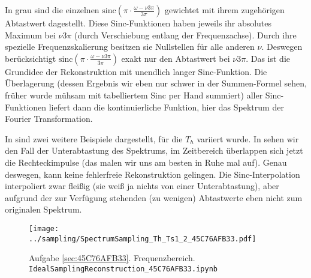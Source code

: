 \begin{Loesung}
In grau sind die einzelnen $\mathrm{sinc}(\pi\cdot\frac{\omega-\nu 3 \pi}{3\pi})$
gewichtet mit ihrem zugehörigen Abtastwert dagestellt.
Diese Sinc-Funktionen haben jeweils ihr absolutes Maximum bei $\nu 3 \pi$ (durch
Verschiebung entlang der Frequenzachse). Durch ihre spezielle Frequenzskalierung
besitzen sie Nullstellen für alle anderen $\nu$. Deswegen
berücksichtigt $\mathrm{sinc}(\pi\cdot\frac{\omega-\nu 3 \pi}{3\pi})$
exakt nur den Abtastwert bei $\nu 3 \pi$. Das ist die Grundidee der Rekonstruktion
mit unendlich langer Sinc-Funktion. Die Überlagerung (dessen Ergebnis wir eben nur schwer
in der Summen-Formel sehen, früher wurde mühsam mit tabelliertem Sinc per Hand summiert)
aller Sinc-Funktionen liefert dann die kontinuierliche Funktion,
hier das Spektrum der Fourier Transformation.



%
In  sind zwei weitere Beispiele
dargestellt, für die $T_h$ variiert wurde.
In  sehen wir den Fall der
Unterabtastung des Spektrums, im Zeitbereich überlappen sich jetzt die
Rechteckimpulse (das malen wir uns am besten in Ruhe mal auf).
Genau deswegen, kann keine fehlerfreie Rekonstruktion gelingen. Die Sinc-Interpolation
interpoliert zwar fleißig (sie weiß ja nichts von einer Unterabtastung), aber aufgrund
der zur Verfügung stehenden (zu wenigen) Abtastwerte eben nicht zum originalen Spektrum.
\end{Loesung}


\begin{figure}
\centering
\texttt{[image: ../sampling/SpectrumSampling\_Th\_Ts1\_2\_45C76AFB33.pdf]}
\caption{Aufgabe \ref{sec:45C76AFB33}. Frequenzbereich. \texttt{IdealSamplingReconstruction\_45C76AFB33.ipynb}}
\label{fig:SpectrumSampling_Th_Ts1_2_45C76AFB33}
\end{figure}




